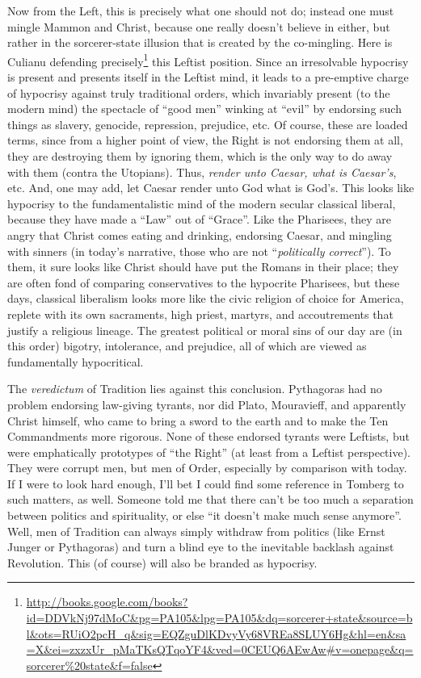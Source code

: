 Now from the Left, this is precisely what one should not do; instead one must mingle Mammon and Christ, because one really doesn't believe in either, but rather in the sorcerer-state illusion that is created by the co-mingling. Here is Culianu defending precisely\footnote{\url{http://books.google.com/books?id=DDVkNj97dMoC&pg=PA105&lpg=PA105&dq=sorcerer+state&source=bl&ots=RUiO2pcH\_q&sig=EQZguDlKDvyVy68VREa8SLUY6Hg&hl=en&sa=X&ei=zxzxUr\_pMaTKsQTqoYF4&ved=0CEUQ6AEwAw\#v=onepage&q=sorcerer\%20state&f=false}} this Leftist position. Since an irresolvable hypocrisy is present and presents itself in the Leftist mind, it leads to a pre-emptive charge of hypocrisy against truly traditional orders, which invariably present (to the modern mind) the spectacle of ``good men'' winking at ``evil'' by endorsing such things as slavery, genocide, repression, prejudice, etc. Of course, these are loaded terms, since from a higher point of view, the Right is not endorsing them at all, they are destroying them by ignoring them, which is the only way to do away with them (contra the Utopians). Thus, \emph{render unto Caesar, what is Caesar's}, etc. And, one may add, let Caesar render unto God what is God's. This looks like hypocrisy to the fundamentalistic mind of the modern secular classical liberal, because they have made a ``Law'' out of ``Grace''. Like the Pharisees, they are angry that Christ comes eating and drinking, endorsing Caesar, and mingling with sinners (in today's narrative, those who are not ``\emph{politically correct}''). To them, it sure looks like Christ should have put the Romans in their place; they are often fond of comparing conservatives to the hypocrite Pharisees, but these days, classical liberalism looks more like the civic religion of choice for America, replete with its own sacraments, high priest, martyrs, and accoutrements that justify a religious lineage. The greatest political or moral sins of our day are (in this order) bigotry, intolerance, and prejudice, all of which are viewed as fundamentally hypocritical.

The \emph{veredictum} of Tradition lies against this conclusion. Pythagoras had no problem endorsing law-giving tyrants, nor did Plato, Mouravieff, and apparently Christ himself, who came to bring a sword to the earth and to make the Ten Commandments more rigorous. None of these endorsed tyrants were Leftists, but were emphatically prototypes of ``the Right'' (at least from a Leftist perspective). They were corrupt men, but men of Order, especially by comparison with today. If I were to look hard enough, I'll bet I could find some reference in Tomberg to such matters, as well. Someone told me that there can't be too much a separation between politics and spirituality, or else ``it doesn't make much sense anymore''. Well, men of Tradition can always simply withdraw from politics (like Ernst Junger or Pythagoras) and turn a blind eye to the inevitable backlash against Revolution. This (of course) will also be branded as hypocrisy.

